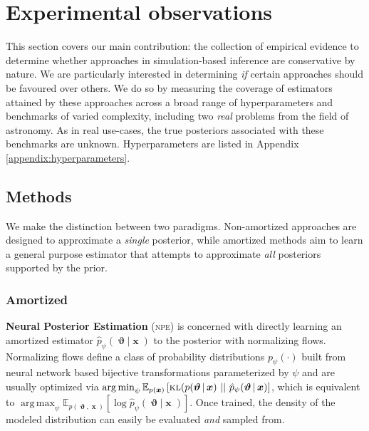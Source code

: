 \documentclass[twoside]{article}
\newcommand{\arnaud}[1]{\textcolor{blue}{AD: #1}}
\DeclareMathOperator*{\argmax}{arg\,max}
\DeclareMathOperator*{\argmin}{arg\,min}
\DeclareMathOperator{\vtheta}{\boldsymbol\vartheta}
\DeclareMathOperator{\vx}{\boldsymbol x}
\newcommand{\npe}{\textsc{npe}}
\begin{document}
\section{Experimental observations}
\label{sec:experiments}
This section covers our main contribution: the collection of empirical evidence to determine whether approaches in simulation-based inference are conservative by nature. 
We are particularly interested in determining \emph{if} certain approaches should be
favoured over others. We do so by measuring the coverage of estimators attained by these approaches across a broad range of hyperparameters and benchmarks of varied complexity, including two \emph{real} problems from the field of astronomy.
As in real use-cases, the true posteriors associated with these benchmarks are unknown.
Hyperparameters are listed in Appendix \ref{appendix:hyperparameters}.
\subsection{Methods}
\label{sec:methods}
We make the distinction between two paradigms.
Non-amortized approaches are designed to approximate a \emph{single} posterior, while amortized methods aim to learn a general purpose estimator that attempts to approximate \emph{all} posteriors supported by the prior. 
\subsubsection{Amortized}
{\bf Neural Posterior Estimation} (\npe) is concerned with directly learning an amortized estimator $\hat{p}_\psi(\vtheta\vert \vx)$ to the posterior with normalizing flows. Normalizing flows define a class of probability distributions $p_\psi(\cdot)$ built from neural network based bijective transformations \citep{dinh2014nice,dinh2016density} parameterized by $\psi$ and are usually optimized via
$\argmin_\psi \mathbb{E}_{p(\vx)} \left[\textsc{kl}(p(\vtheta|\vx)~\vert\vert ~\hat{p}_\psi(\vtheta|\vx)\right]$,
which is equivalent to $\argmax_\psi \mathbb{E}_{p(\vtheta,\vx)}\left[\log \hat{p}_\psi(\vtheta|\vx)\right]$.
Once trained, the density of the modeled distribution can easily be evaluated \emph{and} sampled from.
\end{document}
